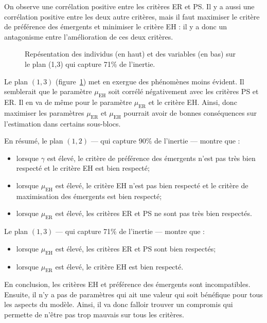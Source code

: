 \documentclass[a4paper, 11pt]{article}
\begin{document}
On observe une corrélation positive entre les critères ER et PS. Il y a aussi une corrélation positive entre les deux autre critères, mais il faut maximiser le critère de préférence des émergents et minimiser le critère EH : il y a donc un antagonisme entre l'amélioration de ces deux critères.



\begin{figure}[ht]
 \centering
 
 
 \caption{Repésentation des individus (en haut) et des variables (en bas) sur le plan (1,3) qui capture 71\% de l'inertie.}
 
 \label{fig:pca2}
\end{figure}

Le plan $(1, 3)$ (figure~\ref{fig:pca2}) met en exergue des phénomènes moins évident. Il semblerait que le paramètre $\mu_{\text{EH}}$ soit corrélé négativement avec les critères PS et ER. Il en va de même pour le paramètre $\mu_{\text{ER}}$ et le critère EH. Ainsi, donc maximiser les paramètres $\mu_{\text{ER}}$ et $\mu_{\text{EH}}$ pourrait avoir de bonnes conséquences sur l'estimation dans certains sous-blocs.


En résumé, le plan $(1,2)$ --- qui capture 90\% de l'inertie --- montre que :
\begin{itemize}
 \item lorsque $\gamma$ est élevé, le critère de préférence des émergents n'est pas très bien respecté et le critère EH est bien respecté;
 \item lorsque $\mu_{\text{EH}}$ est élevé, le critère EH n'est pas bien respecté et le critère de maximisation des émergents est bien respecté;
 \item lorsque $\mu_{\text{ER}}$ est élevé, les critères ER et PS ne sont pas très bien respectés.
\end{itemize}
Le plan $(1, 3)$ --- qui capture 71\% de l'inertie --- montre que :
\begin{itemize}
 \item lorsque $\mu_{\text{EH}}$ est élevé, les critères ER et PS sont bien respectés;
 \item lorsque $\mu_{\text{ER}}$ est élevé, le critère EH est bien respecté.
\end{itemize}

En conclusion, les critères EH et préférence des émergents sont incompatibles. Ensuite, il n'y a pas de paramètres qui ait une valeur qui soit bénéfique pour tous les aspects du modèle. Ainsi, il va donc falloir trouver un compromis qui permette de n'être pas trop mauvais sur tous les critères.
\end{document}
